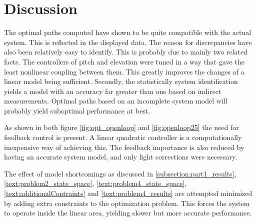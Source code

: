 \section{Discussion}\label{sec:discussion}

The optimal paths computed have shown to be quite compatible with the actual system. This is reflected in the displayed data. The reason for discrepancies have also been relatively easy to identify. This is probably due to mainly two related facts. The controllers of pitch and elevation were tuned in a way that gave the least nonlinear coupling between them. This greatly improves the changes of a linear model being sufficient. Secondly, the statistically system identification yields a model with an accuracy far greater than one based on indirect measurements. Optimal paths based on an incomplete system model will probably yield suboptimal performance at best.

As shown in both figure \ref{fig:opt_openloop} and \ref{fig:openloop25} the need for feedback control is present. A linear quadratic controller is a computationally inexpensive way of achieving this. The feedback importance is also reduced by having an accurate system model, and only light corrections were necessary.

The effect of model shortcomings as discussed in \ref{subsection:part1_results}, \ref{text:problem2_state_space}, \ref{text:problem4_state_space}, \ref{text:additionalContraints} and \ref{text:problem4_results} are attempted minimized by adding extra constraints to the optimization problem. This forces the system to operate inside the linear area, yielding slower but more accurate performance.

